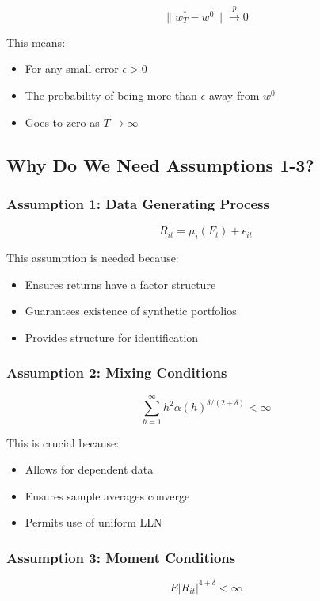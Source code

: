 \documentclass[12pt,article]{memoir}
\begin{document}
\begin{equation}
    \|w_T^* - w^0\| \xrightarrow{p} 0
\end{equation}

This means:
\begin{itemize}
    \item For any small error $\epsilon > 0$
    \item The probability of being more than $\epsilon$ away from $w^0$
    \item Goes to zero as $T \to \infty$
\end{itemize}

\subsection{Why Do We Need Assumptions 1-3?}

\subsubsection{Assumption 1: Data Generating Process}
\begin{equation}
    R_{it} = \mu_i(F_t) + \epsilon_{it}
\end{equation}

This assumption is needed because:
\begin{itemize}
    \item Ensures returns have a factor structure
    \item Guarantees existence of synthetic portfolios
    \item Provides structure for identification
\end{itemize}

\subsubsection{Assumption 2: Mixing Conditions}
\begin{equation}
    \sum_{h=1}^{\infty} h^2\alpha(h)^{\delta/(2+\delta)} < \infty
\end{equation}

This is crucial because:
\begin{itemize}
    \item Allows for dependent data
    \item Ensures sample averages converge
    \item Permits use of uniform LLN
\end{itemize}

\subsubsection{Assumption 3: Moment Conditions}
\begin{equation}
    E|R_{it}|^{4+\delta} < \infty
\end{equation}
\end{document}
